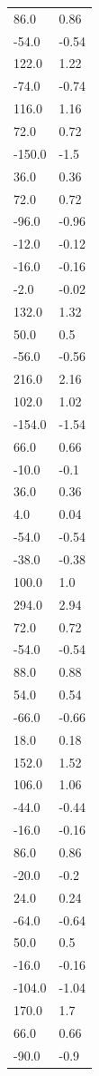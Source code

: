 \begin{longtable}{ll}
86.0 & 0.86 \\
-54.0 & -0.54 \\
122.0 & 1.22 \\
-74.0 & -0.74 \\
116.0 & 1.16 \\
72.0 & 0.72 \\
-150.0 & -1.5 \\
36.0 & 0.36 \\
72.0 & 0.72 \\
-96.0 & -0.96 \\
-12.0 & -0.12 \\
-16.0 & -0.16 \\
-2.0 & -0.02 \\
132.0 & 1.32 \\
50.0 & 0.5 \\
-56.0 & -0.56 \\
216.0 & 2.16 \\
102.0 & 1.02 \\
-154.0 & -1.54 \\
66.0 & 0.66 \\
-10.0 & -0.1 \\
36.0 & 0.36 \\
4.0 & 0.04 \\
-54.0 & -0.54 \\
-38.0 & -0.38 \\
100.0 & 1.0 \\
294.0 & 2.94 \\
72.0 & 0.72 \\
-54.0 & -0.54 \\
88.0 & 0.88 \\
54.0 & 0.54 \\
-66.0 & -0.66 \\
18.0 & 0.18 \\
152.0 & 1.52 \\
106.0 & 1.06 \\
-44.0 & -0.44 \\
-16.0 & -0.16 \\
86.0 & 0.86 \\
-20.0 & -0.2 \\
24.0 & 0.24 \\
-64.0 & -0.64 \\
50.0 & 0.5 \\
-16.0 & -0.16 \\
-104.0 & -1.04 \\
170.0 & 1.7 \\
66.0 & 0.66 \\
-90.0 & -0.9 \\

\end{longtable}
